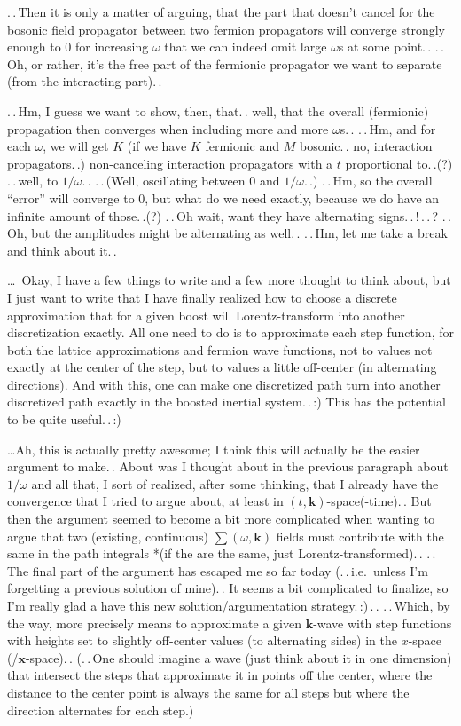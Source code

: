 \documentclass{report}
\begin{document}
.\,.\,Then it is only a matter of arguing, that the part that doesn't cancel for the bosonic field propagator between two fermion propagators will converge strongly enough to 0 for increasing $\omega$ that we can indeed omit large $\omega$s at some point.\,. .\,.\,Oh, or rather, it's the free part of the fermionic propagator we want to separate (from the interacting part).\,. 

.\,.\,Hm, I guess we want to show, then, that.\,. well, that the overall (fermionic) propagation then converges when including more and more $\omega$s.\,. .\,.\,Hm, and for each $\omega$, we will get $K$ (if we have $K$ fermionic and $M$ bosonic.\,. no, interaction propagators.\,.) non-canceling interaction propagators with a $t$ proportional to.\,.(?) .\,.\,well, to $1/\omega$.\,. .\,.\,(Well, oscillating between 0 and $1/\omega$.\,.) .\,.\,Hm, so the overall ``error'' will converge to 0, but what do we need exactly, because we do have an infinite amount of those.\,.(?) %
.\,.\,Oh wait, want they have alternating signs.\,.\,!\,.\,.\,? .\,.\,Oh, but the amplitudes might be alternating as well.\,. .\,.\,Hm, let me take a break and think about it.\,. %

\ldots\ Okay, I have a few things to write and a few more thought to think about, but I just want to write that I have finally realized how to choose a discrete approximation that for a given boost will Lorentz-transform into another discretization exactly. All one need to do is to approximate each step function, for both the lattice approximations and fermion wave functions, not to values not exactly at the center of the step, but to values a little off-center (in alternating directions). And with this, one can make one discretized path turn into another discretized path exactly in the boosted inertial system.\,.\,:) This has the potential to be quite useful.\,.\,:) 

\ldots Ah, this is actually pretty awesome; I think this will actually be the easier argument to make.\,. About was I thought about in the previous paragraph about $1/\omega$ and all that, I sort of realized, after some thinking, that I already have the convergence that I tried to argue about, at least in $(t, \boldsymbol{k})$-space(-time).\,. But then the argument seemed to become a bit more complicated when wanting to argue that two (existing, continuous) $\sum (\omega, \boldsymbol{k})$ fields must contribute with the same in the path integrals *(if the are the same, just Lorentz-transformed).\,. .\,.\,The final part of the argument has escaped me so far today (.\,.\,i.e.\ unless I'm forgetting a previous solution of mine).\,. It seems a bit complicated to finalize, so I'm really glad a have this new solution/argumentation strategy.\,:)\,.\,. .\,.\,Which, by the way, more precisely means to approximate a given $\boldsymbol{k}$-wave with step functions with heights set to slightly off-center values (to alternating sides) in the $x$-space (/$\boldsymbol{x}$-space).\,. (.\,.\,One should imagine a wave (just think about it in one dimension) that intersect the steps that approximate it in points off the center, where the distance to the center point is always the same for all steps but where the direction alternates for each step.)
\end{document}
